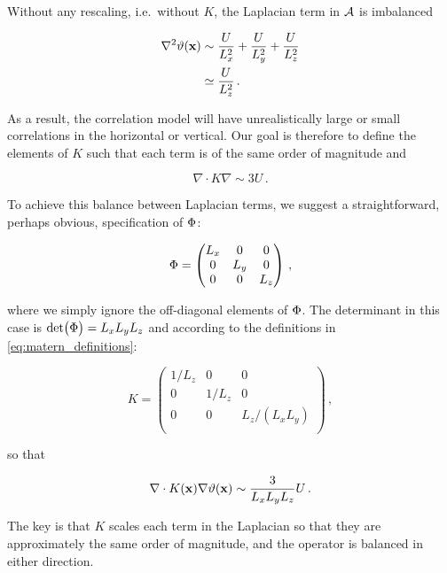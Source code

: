Without any rescaling, i.e.\ without $K$,
the Laplacian term in $\mathcal{A}$ is imbalanced
\begin{linenomath*}\begin{equation}
    \begin{aligned}
        \nabla^2 \vartheta(\mathbf{x})
            & \sim \dfrac{U}{L_x^2} + \dfrac{U}{L_y^2} + \dfrac{U}{L_z^2} \\
            & \simeq \dfrac{U}{L_z^2} \, .
    \end{aligned}
    \label{eq:iso_lap}
\end{equation}\end{linenomath*}
As a result, the correlation model will
have unrealistically large or small correlations in the horizontal or vertical.
Our goal is therefore to define the elements of $K$ such that each term is of
the same order of magnitude and
\begin{linenomath*}\begin{equation*}
    \nabla\cdot K\nabla \sim 3U \, .
\end{equation*}\end{linenomath*}

To achieve this balance between Laplacian terms, we suggest a straightforward,
perhaps obvious, specification of $\Phi$:
\begin{linenomath*}\begin{equation*}
    \Phi =
        \begin{pmatrix}
            L_x & 0 & 0     \\
            0 & L_y & 0     \\
            0 & 0   & L_z   \\
        \end{pmatrix} \, ,
\end{equation*}\end{linenomath*}
where we simply ignore the off-diagonal elements of $\Phi$.
The determinant in this case is $\text{det}\big(\Phi\big) = L_xL_yL_z$ and
according to the definitions in \cref{eq:matern_definitions}:
\begin{linenomath*}\begin{equation*}
    K =
        \begin{pmatrix}
            1/L_z & 0 & 0     \\
            0 & 1/L_z & 0     \\
            0 & 0   & L_z/(L_xL_y)   \\
        \end{pmatrix} \, ,
\end{equation*}\end{linenomath*}
so that
\begin{linenomath*}\begin{equation*}
    \nabla\cdot K(\mathbf{x})\nabla\vartheta(\mathbf{x}) \sim \dfrac{3}{L_xL_yL_z}U \, .
\end{equation*}\end{linenomath*}
The key is that $K$ scales each term in the Laplacian so that they are
approximately the same order of magnitude, and the operator is balanced in either direction.

